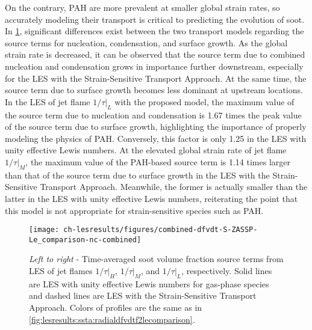 On the contrary, PAH are more prevalent at smaller global strain rates, so accurately modeling their transport is critical to predicting the evolution of soot. In \cref{fig:lesresults:strain:allflamesdfvdt}, significant differences exist between the two transport models regarding the source terms for nucleation, condensation, and surface growth. As the global strain rate is decreased, it can be observed that the source term due to combined nucleation and condensation grows in importance further downstream, especially for the LES with the Strain-Sensitive Transport Approach. At the same time, the source term due to surface growth becomes less dominant at upstream locations. In the LES of jet flame $1/\tau|_L$ with the proposed model, the maximum value of the source term due to nucleation and condensation is 1.67 times the peak value of the source term due to surface growth, highlighting the importance of properly modeling the physics of PAH. Conversely, this factor is only 1.25 in the LES with unity effective Lewis numbers. At the elevated global strain rate of jet flame $1/\tau|_M$, the maximum value of the PAH-based source term is 1.14 times larger than that of the source term due to surface growth in the LES with the Strain-Sensitive Transport Approach. Meanwhile, the former is actually smaller than the latter in the LES with unity effective Lewis numbers, reiterating the point that this model is not appropriate for strain-sensitive species such as PAH.


\begin{figure}[htb]
  \centering
  \texttt{[image: ch-lesresults/figures/combined-dfvdt-S-ZASSP-Le\_comparison-nc-combined]}
  \caption[Centerline \texorpdfstring{$\langle df_V/dt \rangle$}{<dfV/dt>} from LES of Flames \texorpdfstring{$1/\tau|_H$}{1/t|H}, \texorpdfstring{$1/\tau|_M$}{1/t|M}, and \texorpdfstring{$1/\tau|_L$}{1/t|L} with Various Transport Approaches]{\textit{Left to right} - Time-averaged soot volume fraction source terms from LES of jet flames $1/\tau|_H$, $1/\tau|_M$, and $1/\tau|_L$, respectively. Solid lines are LES with unity effective Lewis numbers for gas-phase species and dashed lines are LES with the Strain-Sensitive Transport Approach. Colors of profiles are the same as in \cref{fig:lesresults:ssta:radialdfvdtf2lecomparison}.}
  \label{fig:lesresults:strain:allflamesdfvdt}
\end{figure}

